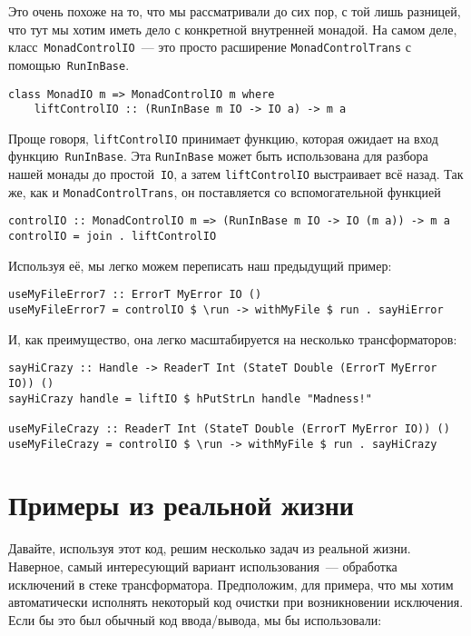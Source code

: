 Это очень похоже на то, что мы рассматривали до сих пор, с той лишь разницей,
что тут мы хотим иметь дело с конкретной внутренней монадой. На самом деле,
класс~\lstinline'MonadControlIO'~--- это просто расширение
\lstinline'MonadControlTrans' с помощью~\lstinline'RunInBase'.

\begin{lstlisting}
class MonadIO m => MonadControlIO m where
    liftControlIO :: (RunInBase m IO -> IO a) -> m a
\end{lstlisting}

Проще говоря, \lstinline'liftControlIO' принимает функцию, которая ожидает на
вход функцию~\lstinline'RunInBase'. Эта \lstinline'RunInBase' может быть
использована для разбора нашей монады до простой~\lstinline'IO', а затем
\lstinline'liftControlIO' выстраивает всё назад. Так же, как и
\lstinline'MonadControlTrans', он поставляется со вспомогательной функцией

\begin{lstlisting}
controlIO :: MonadControlIO m => (RunInBase m IO -> IO (m a)) -> m a
controlIO = join . liftControlIO
\end{lstlisting}

Используя её, мы легко можем переписать наш предыдущий пример:

\begin{lstlisting}
useMyFileError7 :: ErrorT MyError IO ()
useMyFileError7 = controlIO $ \run -> withMyFile $ run . sayHiError
\end{lstlisting}

И, как преимущество, она легко масштабируется на несколько трансформаторов:

\begin{lstlisting}
sayHiCrazy :: Handle -> ReaderT Int (StateT Double (ErrorT MyError IO)) ()
sayHiCrazy handle = liftIO $ hPutStrLn handle "Madness!"

useMyFileCrazy :: ReaderT Int (StateT Double (ErrorT MyError IO)) ()
useMyFileCrazy = controlIO $ \run -> withMyFile $ run . sayHiCrazy
\end{lstlisting}

\section{Примеры из реальной жизни}
Давайте, используя этот код, решим несколько задач из реальной жизни. Наверное,
самый интересующий вариант использования~--- обработка исключений в стеке
трансформатора. Предположим, для примера, что мы хотим автоматически исполнять
некоторый код очистки при возникновении исключения. Если бы это был обычный
код ввода/вывода, мы бы использовали:


